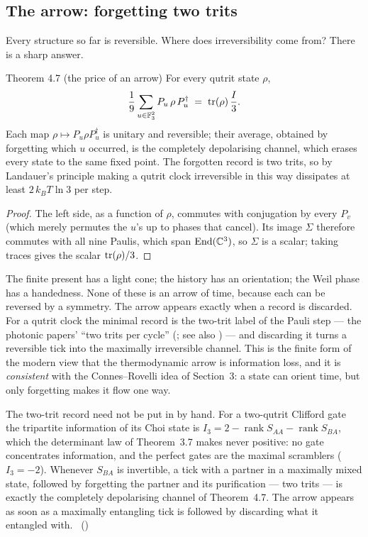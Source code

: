 \subsection{The arrow: forgetting two trits}

Every structure so far is reversible. Where does irreversibility come from? There is a
sharp answer.

\begin{result}{Theorem 4.7 (the price of an arrow) \hfill \tierT}
For every qutrit state $\rho$,
\[
\frac19\sum_{u\in\mathbb{F}_3^2} P_u\,\rho\,P_u^\dagger \;=\; \operatorname{tr}(\rho)\,\frac{I}{3}.
\]
Each map $\rho\mapsto P_u\rho P_u^\dagger$ is unitary and reversible; their average,
obtained by forgetting which $u$ occurred, is the completely depolarising channel, which
erases every state to the same fixed point. The forgotten record is two trits, so by
Landauer's principle \cite{Landauer} making a qutrit clock irreversible in this way dissipates at least
$2\,k_BT\ln3$ per step.
\end{result}

\begin{proof}
The left side, as a function of $\rho$, commutes with conjugation by every $P_v$ (which
merely permutes the $u$'s up to phases that cancel). Its image $\Sigma$ therefore
commutes with all nine Paulis, which span $\mathrm{End}(\mathbb{C}^3)$, so $\Sigma$ is a scalar; taking
traces gives the scalar $\operatorname{tr}(\rho)/3$.
\end{proof}

\begin{physical}
The finite present has a light cone; the history has an orientation; the Weil phase has a
handedness. None of these is an arrow of time, because each can be reversed by a symmetry.
The arrow appears exactly when a record is discarded. For a qutrit clock the minimal
record is the two-trit label of the Pauli step --- the photonic papers' ``two trits per
cycle'' (; see also ) --- and discarding it turns a reversible tick into the maximally
irreversible channel. This is the finite form of the modern view that the thermodynamic
arrow is information loss, and it is \emph{consistent} with the Connes--Rovelli idea of
Section~3: a state can orient time, but only forgetting makes it flow one way. \tierB
\end{physical}

The two-trit record need not be put in by hand. For a two-qutrit Clifford gate the tripartite information of its Choi
state is $I_3=2-\operatorname{rank}S_{AA}-\operatorname{rank}S_{BA}$, which the determinant law of Theorem~3.7 makes
never positive: no gate concentrates information, and the perfect gates are the maximal scramblers ($I_3=-2$). Whenever
$S_{BA}$ is invertible, a tick with a partner in a maximally mixed state, followed by forgetting the partner and its
purification --- two trits --- is exactly the completely depolarising channel of Theorem~4.7. The arrow appears as soon
as a maximally entangling tick is followed by discarding what it entangled with.
\tierC\ ()

